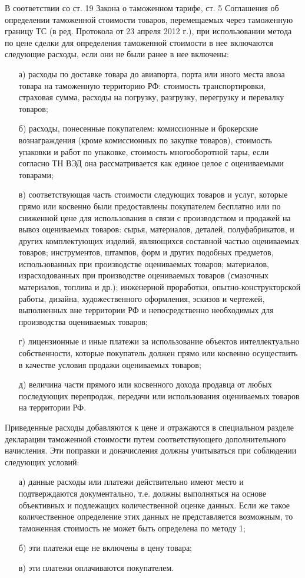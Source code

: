 В соответствии со ст. 19 Закона о таможенном тарифе, ст. 5 Соглашения об определении таможенной стоимости товаров, перемещаемых через таможенную границу ТС (в ред. Протокола от 23 апреля 2012 г.), при использовании метода по цене сделки для определения таможенной стоимости в нее включаются следующие расходы, если они не были ранее в нее включены:
\begin{enumerate}
	\item [а)] расходы по доставке товара до авиапорта, порта или иного места ввоза товара на таможенную территорию РФ: стоимость транспортировки, страховая сумма, расходы на погрузку, разгрузку, перегрузку и перевалку товаров;
	\item [б)] расходы, понесенные покупателем: комиссионные и брокерские вознаграждения (кроме комиссионных по закупке товаров), стоимость упаковки и работ по упаковке, стоимость многооборотной тары, если согласно ТН ВЭД она рассматривается как единое целое с оцениваемыми товарами;
	\item [в)] соответствующая часть стоимости следующих товаров и услуг, которые прямо или косвенно были предоставлены покупателем бесплатно или по сниженной цене для использования в связи с производством и продажей на вывоз оцениваемых товаров: сырья, материалов, деталей, полуфабрикатов, и других комплектующих изделий, являющихся составной частью оцениваемых товаров; инструментов, штампов, форм и других подобных предметов, использованных при производстве оцениваемых товаров; материалов, израсходованных при производстве оцениваемых товаров (смазочных материалов, топлива и др.); инженерной проработки, опытно-конструкторской работы, дизайна, художественного оформления, эскизов и чертежей, выполненных вне территории РФ и непосредственно необходимых для производства оцениваемых товаров;
	\item [г)] лицензионные и иные платежи за использование объектов интеллектуально собственности, которые покупатель должен прямо или косвенно осуществить в качестве условия продажи оцениваемых товаров;
	\item [д)] величина части прямого или косвенного дохода продавца от любых последующих перепродаж, передачи или использования оцениваемых товаров на территории РФ.
\end{enumerate}

Приведенные расходы добавляются к цене и отражаются в специальном разделе декларации таможенной стоимости путем соответствующего дополнительного начисления. Эти поправки и доначисления должны учитываться при соблюдении следующих условий:
\begin{enumerate}
	\item [а)] данные расходы или платежи действительно имеют место и подтверждаются документально, т.е. должны выполняться на основе объективных и подлежащих количественной оценке данных. Если же такое количественное определение этих данных не представляется возможным, то таможенная стоимость не может быть определена по методу 1;
	\item [б)] эти платежи еще не включены в цену товара;
	\item [в)] эти платежи оплачиваются покупателем.
\end{enumerate}

